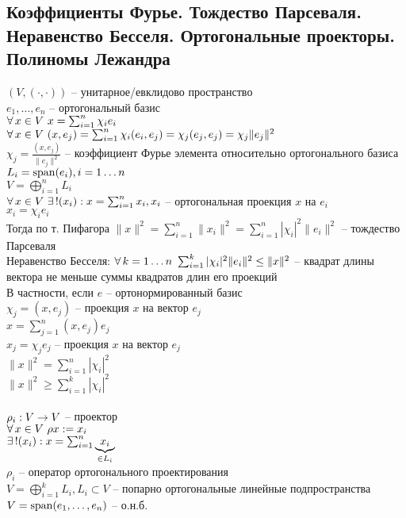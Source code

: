 \documentclass[12pt]{article}
\begin{document}
\subsection{Коэффициенты Фурье. Тождество Парсеваля. Неравенство Бесселя. Ортогональные проекторы. Полиномы Лежандра}
$(V, (\cdot, \cdot))$ -- унитарное/евклидово пространство\\
$e_1, \ldots, e_n$ -- ортогональный базис\\
$\fall x\in V\ x=\sum_{i=1}^n \chi_ie_i$\\
$\fall x\in V\ (x, e_j)=\sum_{i=1}^n \chi_i(e_i, e_j) = \chi_j(e_j, e_j) = \chi_j\|e_j\|^2$\\
$\chi_j = \frac{(x, e_j)}{\|e_j\|^2}$ -- коэффициент Фурье элемента относительно ортогонального базиса\\
$L_i = \span(e_i), i = 1\ldots n$\\
$V = \bigoplus_{i=1}^n L_i$\\
$\fall x\in V\ \ex! (x_i): x = \sum_{i=1}^n x_i, x_i$ -- ортогональная проекция $x$ на $e_i$\\
$x_i = \chi_i e_i$\\
Тогда по т. Пифагора $\|x\|^2 = \sum_{i=1}^n \|x_i\|^2 = \sum_{i=1}^n |\chi_i|^2\|e_i\|^2$ -- тождество Парсеваля\\
Неравенство Бесселя: $\fall k=1\ldots n\ \sum_{i=1}^k |\chi_i|^2\|e_i\|^2 \leq \|x\|^2$ -- квадрат длины вектора не меньше суммы квадратов длин его проекций\\
В частности, если $e$ -- ортонормированный базис\\
$\chi_j = (x, e_j)$ -- проекция $x$ на вектор $e_j$\\
$x = \sum_{j=1}^n (x,e_j)e_j$\\
$x_j = \chi_j e_j$ -- проекция $x$ на вектор $e_j$\\
$\|x\|^2 = \sum_{i=1}^n |\chi_i|^2$\\
$\|x\|^2 \geq \sum_{i=1}^k |\chi_i|^2$\\\\
$\rho_i: V\rto V$ -- проектор\\
$\fall x \in V\ \rho x:= x_i$\\
$\ex! (x_i): x=\sum_{i=1}^n \ub{\in L_i}{x_i}$\\
$\rho_i$ -- оператор ортогонального проектирования\\
$V = \bigoplus_{i=1}^k L_i, L_i \subset V$ -- попарно ортогональные линейные подпространства\\
$V = \span(e_1, \ldots, e_n)$ -- о.н.б.\\
\end{document}
